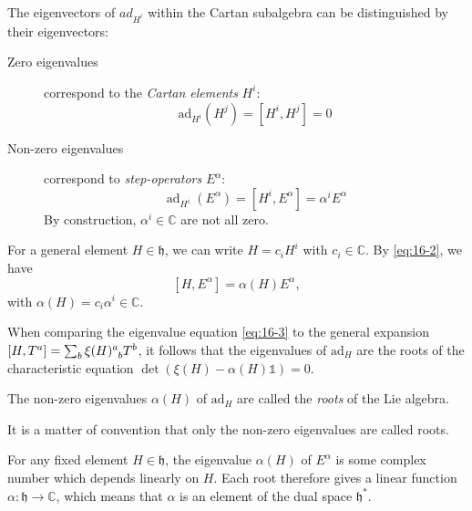 
The eigenvectors of $ad_{H^{i}}$ within the Cartan subalgebra can be distinguished by their eigenvectors:
\begin{description}
  \item[Zero eigenvalues] correspond to the \emph{Cartan elements} $H^{i}$:
    \begin{equation}
      \text{ad}_{H^{i}}(H^{j}) = [H^{i}, H^{j}] = 0
    \end{equation}
  \item[Non-zero eigenvalues] correspond to \emph{step-operators} $E^{\alpha}$:
    \begin{equation}
      \label{eq:16-2}
      \operatorname{ad}_{H^{i}}(E^{\alpha}) = [H^{i}, E^{\alpha}] = \alpha^{i} E^{\alpha}
    \end{equation}
    By construction, $\alpha^{i} \in \mathbb{C}$ are not all zero.
\end{description}

For a general element $H \in \mathfrak{h}$, we can write $H = c_{i} H^{i}$ with $c_{i} \in \mathbb{C}$.
By \eqref{eq:16-2}, we have
\begin{equation}
  \label{eq:16-3}
  [H, E^{\alpha}] = \alpha(H) E^{\alpha},
\end{equation}
with $\alpha(H) = c_{i} \alpha^{i} \in \mathbb{C}$.

\begin{leftbar}
  When comparing the eigenvalue equation \eqref{eq:16-3} to the general expansion $[H, T^{a}] = \sum_b \xi(H)\indices{^{a}_{b}} T^{b}$, it follows that the eigenvalues of $\text{ad}_H$ are the roots of the characteristic equation $\det(\xi(H) - \alpha(H) \mathbb{1}) = 0$.
\end{leftbar}
\begin{definition}[roots]
  \label{def:roots}
  The non-zero eigenvalues $\alpha(H)$ of $\text{ad}_H$ are called the \emph{roots} of the Lie algebra. 
\end{definition}
\begin{leftbar}
  It is a matter of convention that only the non-zero eigenvalues are called roots.
\end{leftbar}

For any fixed element $H \in \mathfrak{h}$, the eigenvalue $\alpha(H)$ of $E^{\alpha}$ is some complex number which depends linearly on $H$.  Each root therefore gives a linear function $\alpha\colon \mathfrak{h} \to \mathbb{C}$, which means that $\alpha$ is an element of the dual space $\mathfrak{h}^*$.  

